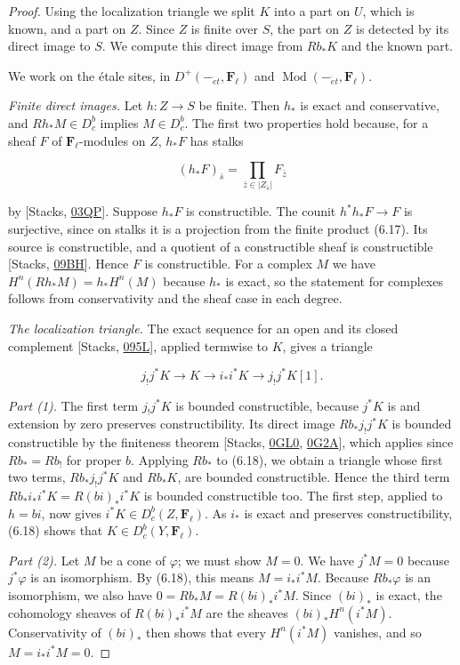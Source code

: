 \documentclass[11pt]{article}
\providecommand{\Dbc}{}\renewcommand{\Dbc}{D^b_c}
\providecommand{\Fell}{}\renewcommand{\Fell}{\mathbf F_\ell}
\begin{document}
\begin{proof}[{Proof}]\label{bp551}%
Using the localization triangle we split \(K\) into a part on \(U\), which is known, and a part on \(Z\). Since \(Z\) is finite over \(S\), the part on \(Z\) is detected by its direct image to \(S\). We compute this direct image from \(Rb_*K\) and the known part.

We work on the étale sites, in \(D^+(-_{\acute{e}t},\Fell)\) and \(\operatorname{Mod}(-_{\acute{e}t},\Fell)\).

\emph{Finite direct images.} Let \(h:Z\to S\) be finite. Then \(h_*\) is exact and conservative, and \(Rh_*M\in\Dbc\) implies \(M\in\Dbc\). The first two properties hold because, for a sheaf \(F\) of \(\Fell\)-modules on \(Z\), \(h_*F\) has stalks

\[
(h_*F)_{\bar s}
=\prod_{\bar z\in |Z_{\bar s}|}F_{\bar z}
\tag{6.17}
\]

by [Stacks, \href{https://stacks.math.columbia.edu/tag/03QP}{03QP}]. Suppose \(h_*F\) is constructible. The counit \(h^*h_*F\to F\) is surjective, since on stalks it is a projection from the finite product (6.17). Its source is constructible, and a quotient of a constructible sheaf is constructible [Stacks, \href{https://stacks.math.columbia.edu/tag/09BH}{09BH}]. Hence \(F\) is constructible. For a complex \(M\) we have \(H^n(Rh_*M)=h_*H^n(M)\) because \(h_*\) is exact, so the statement for complexes follows from conservativity and the sheaf case in each degree.

\emph{The localization triangle.} The exact sequence for an open and its closed complement [Stacks, \href{https://stacks.math.columbia.edu/tag/095L}{095L}], applied termwise to \(K\), gives a triangle

\[
j_!j^*K\longrightarrow K\longrightarrow i_*i^*K
\longrightarrow j_!j^*K[1].
\tag{6.18}
\]

\emph{Part (1).} The first term \(j_!j^*K\) is bounded constructible, because \(j^*K\) is and extension by zero preserves constructibility. Its direct image \(Rb_*j_!j^*K\) is bounded constructible by the finiteness theorem [Stacks, \href{https://stacks.math.columbia.edu/tag/0GL0}{0GL0}, \href{https://stacks.math.columbia.edu/tag/0G2A}{0G2A}], which applies since \(Rb_*=Rb_!\) for proper \(b\). Applying \(Rb_*\) to (6.18), we obtain a triangle whose first two terms, \(Rb_*j_!j^*K\) and \(Rb_*K\), are bounded constructible. Hence the third term \(Rb_*i_*i^*K=R(bi)_*i^*K\) is bounded constructible too. The first step, applied to \(h=bi\), now gives \(i^*K\in\Dbc(Z,\Fell)\). As \(i_*\) is exact and preserves constructibility, (6.18) shows that \(K\in\Dbc(Y,\Fell)\).

\emph{Part (2).} Let \(M\) be a cone of \(\varphi\); we must show \(M=0\). We have \(j^*M=0\) because \(j^*\varphi\) is an isomorphism. By (6.18), this means \(M=i_*i^*M\). Because \(Rb_*\varphi\) is an isomorphism, we also have \(0=Rb_*M=R(bi)_*i^*M\). Since \((bi)_*\) is exact, the cohomology sheaves of \(R(bi)_*i^*M\) are the sheaves \((bi)_*H^n(i^*M)\). Conservativity of \((bi)_*\) then shows that every \(H^n(i^*M)\) vanishes, and so \(M=i_*i^*M=0\).
\end{proof}
\end{document}
